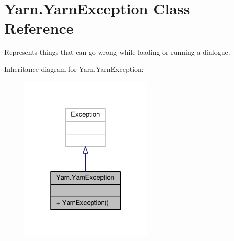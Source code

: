 \hypertarget{a00184}{\section{Yarn.\-Yarn\-Exception Class Reference}
\label{a00184}
}


Represents things that can go wrong while loading or running a dialogue.  




Inheritance diagram for Yarn.\-Yarn\-Exception\-:
\nopagebreak
\begin{figure}[H]
\begin{center}
\leavevmode
\includegraphics[width=184pt]{a00586}
\end{center}
\end{figure}


